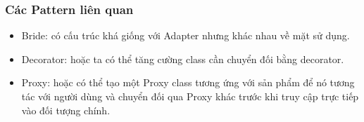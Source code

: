 \subsubsection{Các Pattern liên quan}
\begin{itemize}
    \item Bride: có cấu trúc khá giống với Adapter nhưng khác nhau về mặt sử dụng.
    \item Decorator: hoặc ta có thể tăng cường class cần chuyển đối bằng decorator.
    \item Proxy: hoặc có thể tạo một Proxy class tương ứng với sản phẩm để nó tương tác với người dùng và chuyển đối qua Proxy khác trước khi truy cập trực tiếp vào đối tượng chính.
\end{itemize}